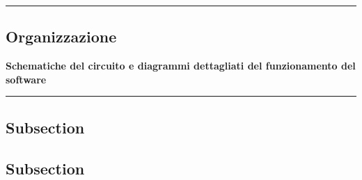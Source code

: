 {\color{gray}\hrule}
\begin{center}
\section{Organizzazione}
\textbf{Schematiche del circuito e diagrammi dettagliati del funzionamento del software}
\bigskip
\end{center}
{\color{gray}\hrule}

\subsection{Subsection}
\lipsum[1]
\subsection{Subsection}
\lipsum[1-3]

\pagebreak